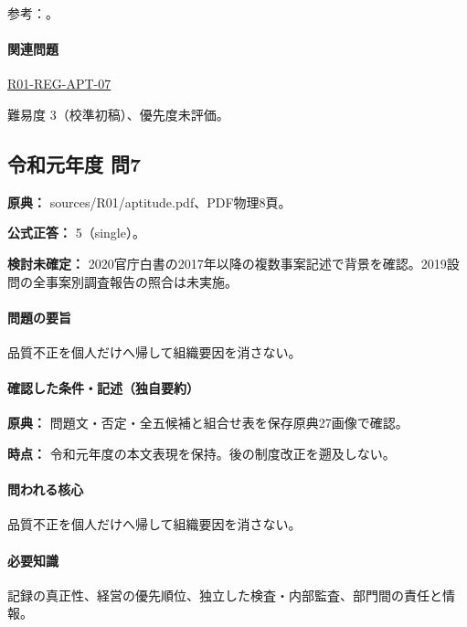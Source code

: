 \par 参考：\cite{saf53_pile2015}。

\paragraph{関連問題} \hyperref[q:r01-reg-apt-07]{R01-REG-APT-07}

\par 難易度 3（校準初稿）、優先度未評価。

\subsection{令和元年度 問7}
\label{q:r01-reg-apt-07}

\noindent\textbf{原典：} sources/R01/aptitude.pdf、PDF物理8頁。

\textbf{公式正答：} 5（single）。

\par\textbf{検討未確定：} 2020官庁白書の2017年以降の複数事案記述で背景を確認。2019設問の全事案別調査報告の照合は未実施。

\paragraph{問題の要旨} 品質不正を個人だけへ帰して組織要因を消さない。

\paragraph{確認した条件・記述（独自要約）}\mbox{}\par

\noindent\textbf{原典：} 問題文・否定・全五候補と組合せ表を保存原典27画像で確認。\par

\noindent\textbf{時点：} 令和元年度の本文表現を保持。後の制度改正を遡及しない。\par

\paragraph{問われる核心} 品質不正を個人だけへ帰して組織要因を消さない。

\paragraph{必要知識} 記録の真正性、経営の優先順位、独立した検査・内部監査、部門間の責任と情報。

